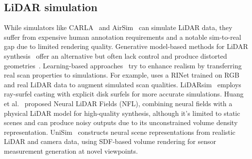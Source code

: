 


\subsection{LiDAR simulation} 
While simulators like CARLA~\cite{dosovitskiy2017carla} and AirSim~\cite{shah2018airsim} can simulate LiDAR data, they suffer from expensive human annotation requirements and a notable sim-to-real gap due to limited rendering quality. Generative model-based methods for LiDAR synthesis~\cite{caccia2019deep,zyrianov2022learning} offer an alternative but often lack control and produce distorted geometries~\cite{li2023pcgen}.
Learning-based approaches~\cite{li2023pcgen,fang2020augmented,manivasagam2020lidarsim} try to enhance realism by transferring real scan properties to simulations. For example, \cite{guillard2022learning} uses a RINet trained on RGB and real LiDAR data to augment simulated scan qualities. LiDARsim~\cite{manivasagam2020lidarsim} employs ray-surfel casting with explicit disk surfels for more accurate simulations.
Huang et al.~\cite{Huang2023nfl} proposed Neural LiDAR Fields (NFL), combining neural fields with a physical LiDAR model for high-quality synthesis, although it's limited to static scenes and can produce noisy outputs due to its unconstrained volume density representation.
UniSim~\cite{yang2023unisim} constructs neural scene representations from realistic LiDAR and camera data, using SDF-based volume rendering for sensor measurement generation at novel viewpoints.


